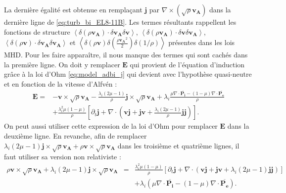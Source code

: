 La dernière égalité est obtenue en remplaçant $\boldsymbol{j}$ par $\nabla \times \left( \sqrt{\rho}\boldsymbol{v_A}\right)$ dans la dernière ligne de \eqref{eq:turb_bi_EL8-11B}. Les termes résultants rappellent les fonctions de structure $\left<\delta (\rho \boldsymbol{v_A})\cdot  \delta \boldsymbol{v_A} \delta \boldsymbol{v}\right>$, $\left<\delta (\rho \boldsymbol{v_A})\cdot  \delta \boldsymbol{v} \delta \boldsymbol{v_A}\right>$, $\left<\delta (\rho \boldsymbol{v})\cdot  \delta \boldsymbol{v_A} \delta \boldsymbol{v_A}\right>$ et $\left<\delta (\rho \boldsymbol{v}) \delta  (\frac{\rho \boldsymbol{v_A}^2}{2}) \delta (1/\rho) \right>$ présentes dans les lois \ac{MHD}. Pour les faire apparaître, il nous manque des termes qui sont cachés dans la première ligne. On doit y remplacer $\boldsymbol{E}$ qui provient de l'équation d'induction grâce à la loi d'Ohm \eqref{eq:model_adbi_j} qui devient avec l'hypothèse quasi-neutre et en fonction de la vitesse d'Alfvén :
\begin{equation}\label{eq:model_adbi_jqn}\begin{array}{rl}
 \boldsymbol{E} =& -  \boldsymbol{v}  \times \sqrt{\rho}\boldsymbol{v_A}
-   \frac{\lambda_i(2\mu-1)}{\rho}  \boldsymbol{j} \times \sqrt{\rho}\boldsymbol{v_A}
+  \lambda_i \frac{\mu \nabla \cdot \overline{\boldsymbol{P_i}} - (1-\mu) \nabla \cdot \overline{\boldsymbol{P_e}}}{\rho} \\%
&+\frac{\lambda_i^2 \mu (1-\mu)}{\rho} \left[\partial_t \boldsymbol{j} + \nabla \cdot (
  \boldsymbol{v}  \boldsymbol{j}  
+  \boldsymbol{j}  \boldsymbol{v} 
+\frac{ \lambda_i(2\mu -1 )}{\rho}\boldsymbol{j} \boldsymbol{j} ) \right] . 
\end{array}\end{equation}
On peut aussi utiliser cette expression de la loi d'Ohm pour remplacer $\boldsymbol{E}$ dans la deuxième ligne. En revanche, afin de remplacer $\lambda_i (2\mu-1)  \boldsymbol{j} \times\sqrt{\rho}\boldsymbol{v_A} + \rho \boldsymbol{v}  \times \sqrt{\rho}\boldsymbol{v_A} $ dans les troisième et quatrième lignes, il faut utiliser sa version non relativiste : 
\begin{eqnarray}
\label{eq:model_adbi_jqr}   \rho \boldsymbol{v}  \times \sqrt{\rho}\boldsymbol{v_A}
+   \lambda_i(2\mu-1)  \boldsymbol{j} \times \sqrt{\rho}\boldsymbol{v_A} 
&=&\frac{\lambda_i^2 \mu (1-\mu)}{\rho} \left[\partial_t \boldsymbol{j} + \nabla \cdot (
  \boldsymbol{v}  \boldsymbol{j}  
+  \boldsymbol{j}  \boldsymbol{v} 
+\lambda_i(2\mu -1 )\boldsymbol{j} \boldsymbol{j} ) \right] \nonumber\\
&&+\lambda_i (\mu \nabla \cdot \overline{\boldsymbol{P_i}} - (1-\mu) \nabla \cdot \overline{\boldsymbol{P_e}}) .
\end{eqnarray}

